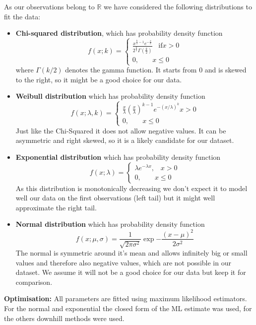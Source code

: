\documentclass[11pt]{article}
\begin{document}
As our observations belong to $\mathbb{R}$ we have considered the following distributions to fit the data:
\begin{itemize}
    \item \textbf{Chi-squared distribution}, which has probability density function
    \[
    f(x;k) = \begin{cases}
    \frac{x^{\frac{k}{2}-1}e^{-\frac{x}{2}}}{2^{\frac{k}{2}}\Gamma(\frac{k}{2})} \;\;\;\text{if} x>0\\
    0, \;\;\;\;\;\;\; x\leq 0
    \end{cases}
    \]
    where $\Gamma(k/2)$ denotes the gamma function. 
    It starts from 0 and is skewed to the right, so it might be a good choice for our data.
    \item \textbf{Weibull distribution}
    which has probability density function
    \[
    f(x;\lambda,k) = \begin{cases}
    \frac{x}{\lambda}\left(\frac{x}{\lambda}\right)^{k-1}e^{-(x/\lambda)^k} x>0\\
    0, \;\;\;\;\;\;\; x\leq 0
    \end{cases}
    \]
    Just like the Chi-Squared it does not allow negative values. It can be asymmetric and right skewed, so it is a likely candidate for our dataset. 
    
    \item \textbf{Exponential distribution} which has probability density function
    \[
    f(x;\lambda) = \begin{cases}
    \lambda e^{-\lambda x},\;\;\; x>0\\
    0, \;\;\;\;\;\;\; x\leq 0
    \end{cases}
    \]
    As this distribution is monotonically decreasing we don't expect it to model well our data on the first observations (left tail) but it might well approximate the right tail.
    
    \item \textbf{Normal distribution} which has probability density function
    \[
    f(x; \mu, \sigma) = \frac{1}{\sqrt{2\pi \sigma^2}}\exp{-\frac{(x-\mu)^2}{2\sigma^2}}
    \]
    The normal is symmetric around it's mean and allows infinitely big or small values and therefore also negative values, which are not possible in our dataset. We assume it will not be a good choice for our data but keep it for comparison.
    
    
\end{itemize}


\textbf{Optimisation:} All parameters are fitted using maximum likelihood estimators. For the normal and exponential the closed form of the ML estimate was used, for the others downhill methods were used.
\end{document}
